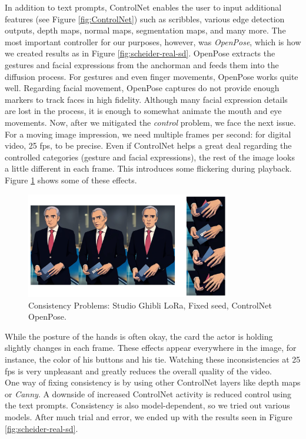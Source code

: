 \documentclass[
  a4paper,  %
  twoside,  %
  bibliography=totoc,
  headsepline,
  cleardoublepage=empty,
  parskip=half,
  draft=false
]{scrbook}
\begin{document}
In addition to text prompts, ControlNet enables the user to input additional features (see Figure \ref{fig:ControlNet}) such as scribbles, various edge detection outputs, depth maps, normal maps, segmentation maps, and many more. The most important controller for our purposes, however, was \textit{OpenPose}, which is how we created results as in Figure \ref{fig:scheider-real-sd}. OpenPose extracts the gestures and facial expressions from the anchorman and feeds them into the diffusion process. For gestures and even finger movements, OpenPose works quite well. Regarding facial movement, OpenPose captures do not provide enough markers to track faces in high fidelity. Although many facial expression details are lost in the process, it is enough to somewhat animate the mouth and eye movements.
Now, after we mitigated the \textit{control} problem, we face the next issue. For a moving image impression, we need multiple frames per second: for digital video, 25 \gls{fps}, to be precise. Even if ControlNet helps a great deal regarding the controlled categories (gesture and facial expressions), the rest of the image looks a little different in each frame. This introduces some flickering during playback. Figure \ref{fig:controlnet-issues} shows some of these effects.

\begin{figure}[h]
  \centering
  \includegraphics[width=0.8\textwidth]{./graphics/diffusion/ControlNet-issues.png}
  \caption{Consistency Problems: Studio Ghibli LoRa, Fixed seed, ControlNet OpenPose.}
  \label{fig:controlnet-issues}
\end{figure}

While the posture of the hands is often okay, the card the actor is holding slightly changes in each frame. These effects appear everywhere in the image, for instance, the color of his buttons and his tie. Watching these inconsistencies at 25 \gls{fps} is very unpleasant and greatly reduces the overall quality of the video. \\
One way of fixing consistency is by using other ControlNet layers like depth maps or \textit{Canny}. A downside of increased ControlNet activity is reduced control using the text prompts. Consistency is also model-dependent, so we tried out various models. After much trial and error, we ended up with the results seen in Figure \ref{fig:scheider-real-sd}.
\end{document}
